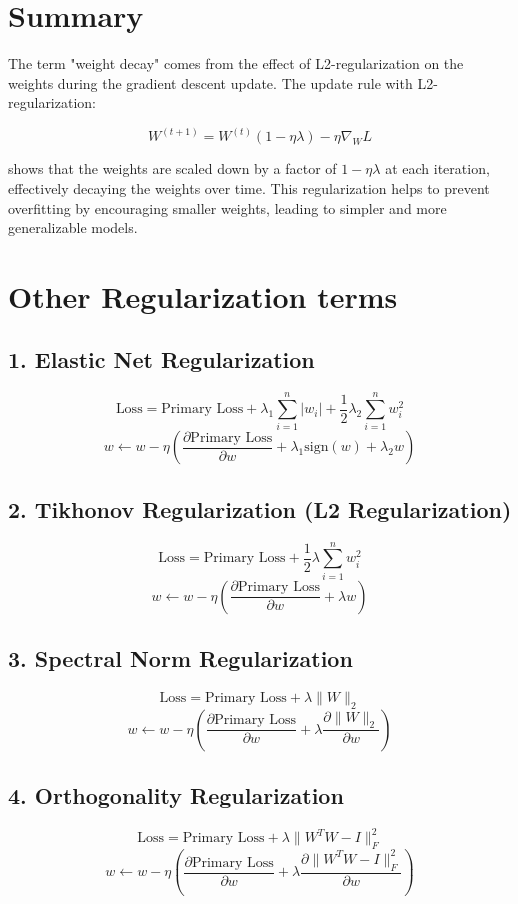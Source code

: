 \documentclass{article}
\begin{document}
\section*{Summary}

The term "weight decay" comes from the effect of L2-regularization on the weights during the gradient descent update. The update rule with L2-regularization:

\[
W^{(t+1)} = W^{(t)} \left( 1 - \eta \lambda \right) - \eta \nabla_W L
\]

shows that the weights are scaled down by a factor of \( 1 - \eta \lambda \) at each iteration, effectively decaying the weights over time. This regularization helps to prevent overfitting by encouraging smaller weights, leading to simpler and more generalizable models.

\section*{Other Regularization terms}

\subsection*{1. Elastic Net Regularization}
\[
\text{Loss} = \text{Primary Loss} + \lambda_1 \sum_{i=1}^{n} |w_i| + \frac{1}{2} \lambda_2 \sum_{i=1}^{n} w_i^2
\]
\[
w \leftarrow w - \eta \left( \frac{\partial \text{Primary Loss}}{\partial w} + \lambda_1 \text{sign}(w) + \lambda_2 w \right)
\]

\subsection*{2. Tikhonov Regularization (L2 Regularization)}
\[
\text{Loss} = \text{Primary Loss} + \frac{1}{2} \lambda \sum_{i=1}^{n} w_i^2
\]
\[
w \leftarrow w - \eta \left( \frac{\partial \text{Primary Loss}}{\partial w} + \lambda w \right)
\]

\subsection*{3. Spectral Norm Regularization}
\[
\text{Loss} = \text{Primary Loss} + \lambda \|W\|_2
\]
\[
w \leftarrow w - \eta \left( \frac{\partial \text{Primary Loss}}{\partial w} + \lambda \frac{\partial \|W\|_2}{\partial w} \right)
\]

\subsection*{4. Orthogonality Regularization}
\[
\text{Loss} = \text{Primary Loss} + \lambda \|W^T W - I\|_F^2
\]
\[
w \leftarrow w - \eta \left( \frac{\partial \text{Primary Loss}}{\partial w} + \lambda \frac{\partial \|W^T W - I\|_F^2}{\partial w} \right)
\]
\end{document}

